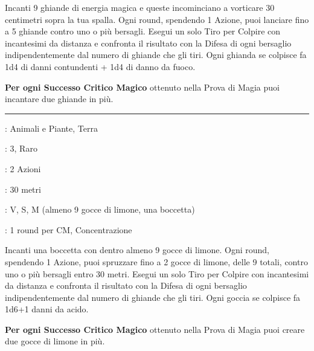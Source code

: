 \begin{multicols}{2}
Incanti 9 ghiande di energia magica e queste incominciano a vorticare 30 centimetri sopra la tua spalla.
Ogni round, spendendo 1 Azione, puoi lanciare fino a 5 ghiande contro uno o più bersagli.
Esegui un solo Tiro per Colpire con incantesimi da distanza e confronta il risultato con la Difesa di ogni bersaglio indipendentemente dal numero di ghiande che gli tiri. Ogni ghianda se colpisce fa 1d4 di danni contundenti + 1d4 di danno da fuoco.

\textbf{Per ogni Successo Critico Magico} ottenuto nella Prova di Magia puoi incantare due ghiande in più.

\smallskip\noindent\rule{\linewidth}{2pt} \hypertarget{Gragnola di Limoni di Kyrin}{}\smallskip{}
\noindent
\begin{description}[noitemsep, topsep=0pt, parsep=0pt, partopsep=0pt, leftmargin=0cm, labelwidth=2.8cm]
	\item[\textbf{Lista di Magia}]: Animali e Piante, Terra
	\item[\textbf{Livello}]: 3, Raro
	\item[\textbf{T. di Lancio}]: 2 Azioni
	\item[\textbf{Gittata}]: 30 metri
	\item[\textbf{Componenti}]: V, S, M (almeno 9 gocce di limone, una boccetta)
	\item[\textbf{Durata}]: 1 round per CM, Concentrazione
\end{description}

Incanti una boccetta con dentro almeno 9 gocce di limone.
Ogni round, spendendo 1 Azione, puoi spruzzare fino a 2 gocce di limone, delle 9 totali, contro uno o più bersagli entro 30 metri.
Esegui un solo Tiro per Colpire con incantesimi da distanza e confronta il risultato con la Difesa di ogni bersaglio indipendentemente dal numero di ghiande che gli tiri. Ogni goccia se colpisce fa 1d6+1 danni da acido.

\textbf{Per ogni Successo Critico Magico} ottenuto nella Prova di Magia puoi creare due gocce di limone in più.


\end{multicols}
